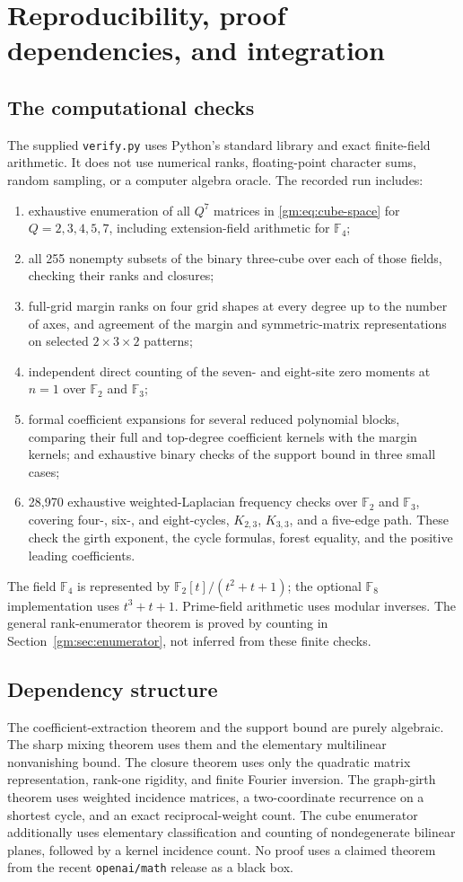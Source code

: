 \documentclass[11pt,a4paper]{article}
\numberwithin{equation}{section}
\theoremstyle{definition}
\theoremstyle{remark}
\newcommand{\F}{\mathbb F}
\newcommand{\1}{\mathbf 1}
\begin{document}
\section{Reproducibility, proof dependencies, and integration}
\label{gm:sec:repro}

\subsection{The computational checks}
The supplied \texttt{verify.py} uses Python's standard library and exact
finite-field arithmetic. It does not use numerical ranks, floating-point
character sums, random sampling, or a computer algebra oracle. The
recorded run includes:
\begin{enumerate}[label=(\roman*)]
\item exhaustive enumeration of all $Q^7$ matrices in
\eqref{gm:eq:cube-space} for $Q=2,3,4,5,7$, including extension-field
arithmetic for $\F_4$;
\item all 255 nonempty subsets of the binary three-cube over each of
those fields, checking their ranks and closures;
\item full-grid margin ranks on four grid shapes at every degree up to
the number of axes, and agreement of the margin and symmetric-matrix
representations on selected $2\times3\times2$ patterns;
\item independent direct counting of the seven- and eight-site zero
moments at $n=1$ over $\F_2$ and $\F_3$;
\item formal coefficient expansions for several reduced polynomial
blocks, comparing their full and top-degree coefficient kernels with the
margin kernels; and exhaustive binary checks of the support bound in
three small cases;
\item 28,970 exhaustive weighted-Laplacian frequency checks over
$\F_2$ and $\F_3$, covering four-, six-, and eight-cycles, $K_{2,3}$,
$K_{3,3}$, and a five-edge path. These check the girth exponent, the cycle
formulas, forest equality, and the positive leading coefficients.
\end{enumerate}
The field $\F_4$ is represented by $\F_2[t]/(t^2+t+1)$; the optional
$\F_8$ implementation uses $t^3+t+1$. Prime-field arithmetic uses modular
inverses. The general rank-enumerator theorem is proved by counting in
Section~\ref{gm:sec:enumerator}, not inferred from these finite checks.

\subsection{Dependency structure}
The coefficient-extraction theorem and the support bound are purely
algebraic. The sharp mixing theorem uses them and the elementary
multilinear nonvanishing bound. The closure theorem uses only the
quadratic matrix representation, rank-one rigidity, and finite Fourier
inversion. The graph-girth theorem uses weighted incidence matrices, a two-coordinate
recurrence on a shortest cycle, and an exact reciprocal-weight count.
The cube enumerator additionally uses elementary classification
and counting of nondegenerate bilinear planes, followed by a kernel
incidence count. No proof uses a claimed theorem from the recent
\texttt{openai/math} release as a black box.
\end{document}
